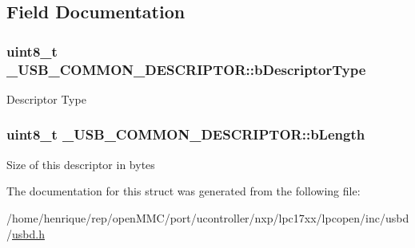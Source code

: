 \subsection{Field Documentation}
\hypertarget{struct__USB__COMMON__DESCRIPTOR_a67186df405d9bc8ed78bcf60926be924}{
\subsubsection[{b\-Descriptor\-Type}]{\setlength{\rightskip}{0pt plus 5cm}uint8\-\_\-t \-\_\-\-U\-S\-B\-\_\-\-C\-O\-M\-M\-O\-N\-\_\-\-D\-E\-S\-C\-R\-I\-P\-T\-O\-R\-::b\-Descriptor\-Type}}\label{struct__USB__COMMON__DESCRIPTOR_a67186df405d9bc8ed78bcf60926be924}
Descriptor Type \hypertarget{struct__USB__COMMON__DESCRIPTOR_a3b232c5c49b059c8df010496ca69868b}{
\subsubsection[{b\-Length}]{\setlength{\rightskip}{0pt plus 5cm}uint8\-\_\-t \-\_\-\-U\-S\-B\-\_\-\-C\-O\-M\-M\-O\-N\-\_\-\-D\-E\-S\-C\-R\-I\-P\-T\-O\-R\-::b\-Length}}\label{struct__USB__COMMON__DESCRIPTOR_a3b232c5c49b059c8df010496ca69868b}
Size of this descriptor in bytes 

The documentation for this struct was generated from the following file\-:\begin{DoxyCompactItemize}
\item 
/home/henrique/rep/open\-M\-M\-C/port/ucontroller/nxp/lpc17xx/lpcopen/inc/usbd/\hyperlink{usbd_8h}{usbd.\-h}\end{DoxyCompactItemize}
